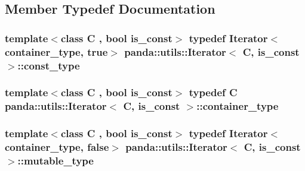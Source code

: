 \subsection{Member Typedef Documentation}
\hypertarget{classpanda_1_1utils_1_1Iterator_a4b92948268861cb3f519cc9a4c46e4cb}{
\subsubsection[{const\_\-type}]{\setlength{\rightskip}{0pt plus 5cm}template$<$class C , bool is\_\-const$>$ typedef {\bf Iterator}$<${\bf container\_\-type}, true$>$ {\bf panda::utils::Iterator}$<$ C, is\_\-const $>$::{\bf const\_\-type}}}
\label{classpanda_1_1utils_1_1Iterator_a4b92948268861cb3f519cc9a4c46e4cb}
\hypertarget{classpanda_1_1utils_1_1Iterator_a11d51c3c28183fbf26ca5bd34e97d9cc}{
\subsubsection[{container\_\-type}]{\setlength{\rightskip}{0pt plus 5cm}template$<$class C , bool is\_\-const$>$ typedef C {\bf panda::utils::Iterator}$<$ C, is\_\-const $>$::{\bf container\_\-type}}}
\label{classpanda_1_1utils_1_1Iterator_a11d51c3c28183fbf26ca5bd34e97d9cc}
\hypertarget{classpanda_1_1utils_1_1Iterator_a05b47f8857b9a69c113cde13d0e1690c}{
\subsubsection[{mutable\_\-type}]{\setlength{\rightskip}{0pt plus 5cm}template$<$class C , bool is\_\-const$>$ typedef {\bf Iterator}$<${\bf container\_\-type}, false$>$ {\bf panda::utils::Iterator}$<$ C, is\_\-const $>$::{\bf mutable\_\-type}}}
\label{classpanda_1_1utils_1_1Iterator_a05b47f8857b9a69c113cde13d0e1690c}
